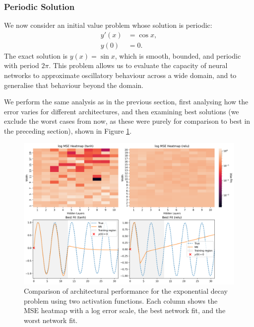 \subsubsection{Periodic Solution}

We now consider an initial value problem whose solution is periodic:
\[
\begin{aligned}
    y'(x) &= \cos x, \\
    y(0) &= 0.
\end{aligned}
\]
The exact solution is \( y(x) = \sin x \), which is smooth, bounded, and periodic with period \( 2\pi \).  
This problem allows us to evaluate the capacity of neural networks to approximate oscillatory behaviour
across a wide domain, and to generalise that behaviour beyond the domain.  

We perform the same analysis as in the previous section, first analysing how the error varies
for different architectures, and then examining best solutions (we exclude the worst 
cases from now, as these were purely for comparison to best in the preceding section), shown in Figure 
\ref{fig:ivp_periodic_sidebyside}.

\begin{figure}[htbp]
    \centering
    \includegraphics[width=\textwidth]{graphics/ivp_periodic_combined.png}
    \caption{Comparison of architectural performance for the exponential decay problem using two 
    activation functions. Each column shows the MSE heatmap with a log error scale,
    the best network fit, and the worst network fit.}
    \label{fig:ivp_periodic_sidebyside}
\end{figure}

